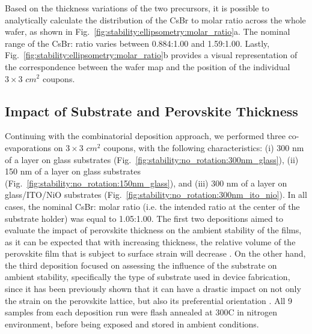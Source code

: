Based on the thickness variations of the two precursors, it is possible to analytically calculate the distribution of the CsBr to  molar ratio across the whole wafer, as shown in Fig.~\ref{fig:stability:ellipsometry:molar_ratio}a. The nominal range of the CsBr: ratio varies between 0.884:1.00 and 1.59:1.00. Lastly, Fig.~\ref{fig:stability:ellipsometry:molar_ratio}b provides a visual representation of the correspondence between the wafer map and the position of the individual $3\times3$ $cm^2$ coupons.
 

\subsection{Impact of Substrate and Perovskite Thickness}

Continuing with the combinatorial deposition approach, we performed three co-evaporations on $3\times3$ $cm^2$ coupons, with the following characteristics: (i) 300 nm of a  layer on glass substrates (Fig.~\ref{fig:stability:no_rotation:300nm_glass}), (ii) 150 nm of a  layer on glass substrates (Fig.~\ref{fig:stability:no_rotation:150nm_glass}), and (iii) 300 nm of a  layer on glass/ITO/NiO substrates (Fig.~\ref{fig:stability:no_rotation:300nm_ito_nio}). In all cases, the nominal CsBr: molar ratio (i.e. the intended ratio at the center of the substrate holder) was equal to 1.05:1.00. The first two depositions aimed to evaluate the impact of perovskite thickness on the ambient stability of the films, as it can be expected that with increasing thickness, the relative volume of the perovskite film that is subject to surface strain will decrease \cite{Steele2019ThermalFilms}. On the other hand, the third deposition focused on assessing the influence of the substrate on ambient stability, specifically the type of substrate used in device fabrication, since it has been previously shown that it can have a drastic impact on not only the strain on the perovskite lattice, but also its preferential orientation \cite{Abzieher2021FromCells, Xue2020RegulatingLayers}. All 9 samples from each deposition run were flash annealed at 300\degree C in nitrogen environment, before being exposed and stored in ambient conditions. 



